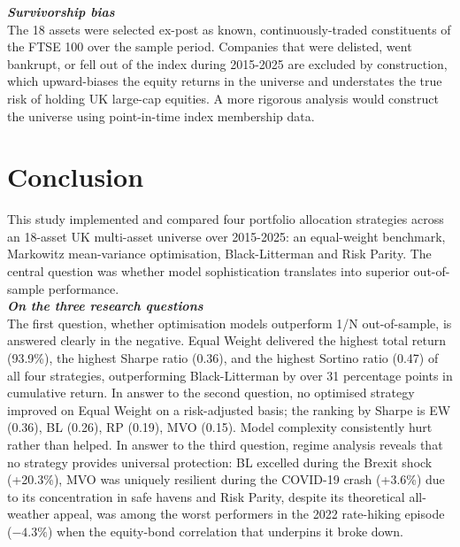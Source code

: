 \documentclass[a4paper,alpha-refs]{scr-contemporary}
\numberwithin{equation}{section}
\begin{document}
\noindent\textbf{\emph{Survivorship bias}} \\
\indent The 18 assets were selected ex-post as known, continuously-traded
constituents of the FTSE 100 over the sample period. \newline
\indent Companies that were delisted, went bankrupt, or fell out of the index 
during 2015-2025 are excluded by construction, which upward-biases the equity 
returns in the universe and understates the true risk of holding UK large-cap 
equities. \newline
\indent A more rigorous analysis would construct the universe using point-in-time 
index membership data.

\section{Conclusion}

\indent \indent This study implemented and compared four portfolio allocation strategies
across an 18-asset UK multi-asset universe over 2015-2025: an equal-weight benchmark,
Markowitz mean-variance optimisation, Black-Litterman and Risk Parity. The central
question was whether model sophistication translates into superior out-of-sample
performance. \\

\noindent\textbf{\emph{On the three research questions}} \\
\indent The first question, whether optimisation models outperform 1/N out-of-sample,
is answered clearly in the negative. Equal Weight delivered the highest total return
(93.9\%), the highest Sharpe ratio (0.36), and the highest Sortino ratio (0.47) of
all four strategies, outperforming Black-Litterman by over 31 percentage points in
cumulative return. \newline
\indent In answer to the second question, no optimised strategy improved
on Equal Weight on a risk-adjusted basis; the ranking by Sharpe is EW (0.36),
BL (0.26), RP (0.19), MVO (0.15). Model complexity consistently hurt rather than
helped. \newline 
\indent In answer to the third question, regime analysis reveals that no strategy
provides universal protection: BL excelled during the Brexit shock (+20.3\%), MVO was
uniquely resilient during the COVID-19 crash (+3.6\%) due to its concentration in safe
havens and Risk Parity, despite its theoretical all-weather appeal, was among the
worst performers in the 2022 rate-hiking episode ($-4.3\%$) when the equity-bond
correlation that underpins it broke down. \\
\end{document}
